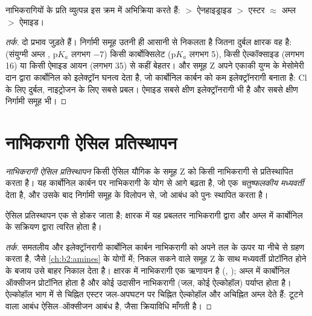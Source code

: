 \begin{proposition}[अभिक्रियाशीलता पैमाना]\label{prop:b2:acyl-substitution:reactivity}
नाभिकरागियों के प्रति व्युत्पन्न इस क्रम में अभिक्रिया करते हैं:  $>$ ऐनहाइड्राइड $>$ एस्टर
$\approx$ अम्ल $>$ ऐमाइड।
\end{proposition}

\begin{proof}[तर्क]
दो प्रभाव जुड़ते हैं। निर्गामी समूह  उतनी ही आसानी से निकलता है जितना दुर्बल क्षारक वह है:
 (संयुग्मी अम्ल , $\mathrm pK_a$ लगभग $-7$) किसी कार्बोक्सिलेट
($\mathrm pK_a$ लगभग 5), किसी ऐल्कॉक्साइड (लगभग 16) या किसी ऐमाइड आयन (लगभग 35) से कहीं बेहतर। और समूह Z
अपने एकाकी युग्म के मेसोमेरी दान द्वारा कार्बोनिल को इलेक्ट्रॉन घनत्व देता है, जो कार्बोनिल
कार्बन को कम इलेक्ट्रॉनरागी बनाता है: Cl के लिए दुर्बल, नाइट्रोजन के लिए सबसे प्रबल। ऐमाइड सबसे क्षीण
इलेक्ट्रॉनरागी भी है और सबसे क्षीण निर्गामी समूह भी।
\end{proof}

\section{नाभिकरागी ऐसिल प्रतिस्थापन}

\begin{definition}[नाभिकरागी ऐसिल प्रतिस्थापन]\label{def:b2:acyl-substitution:nas}
\emph{नाभिकरागी ऐसिल प्रतिस्थापन} किसी ऐसिल यौगिक के समूह Z
को किसी नाभिकरागी से प्रतिस्थापित करता है। यह कार्बोनिल कार्बन पर नाभिकरागी के योग से आगे बढ़ता है,
जो एक \emph{चतुष्फलकीय मध्यवर्ती} देता है, और उसके बाद
निर्गामी समूह के विलोपन से, जो  आबंध को पुनः स्थापित करता है।
\end{definition}

\begin{proposition}[योग--विलोपन]\label{prop:b2:acyl-substitution:addition-elimination}
ऐसिल प्रतिस्थापन एक  से होकर जाता है; क्षारक में यह प्रबलतर
नाभिकरागी द्वारा और अम्ल में कार्बोनिल के सक्रियण द्वारा त्वरित होता है।
\end{proposition}

\begin{proof}[तर्क]
समतलीय और इलेक्ट्रॉनरागी कार्बोनिल कार्बन नाभिकरागी को अपने तल के ऊपर या नीचे से
ग्रहण करता है, जैसे \cref{ch:b2:amines} के योगों में; निकल सकने वाले समूह Z के साथ मध्यवर्ती
प्रोटॉनित होने के बजाय उसे बाहर निकाल देता है। क्षारक में नाभिकरागी एक ऋणायन है (,
); अम्ल में कार्बोनिल ऑक्सीजन प्रोटॉनित होता है और कोई उदासीन नाभिकरागी (जल, कोई ऐल्कोहॉल)
पर्याप्त होता है। ऐल्कोहॉल भाग में  से चिह्नित एस्टर जल-अपघटन पर चिह्नित ऐल्कोहॉल
और अचिह्नित अम्ल देते हैं: टूटने वाला आबंध ऐसिल--ऑक्सीजन आबंध है, जैसा क्रियाविधि माँगती है।
\end{proof}

